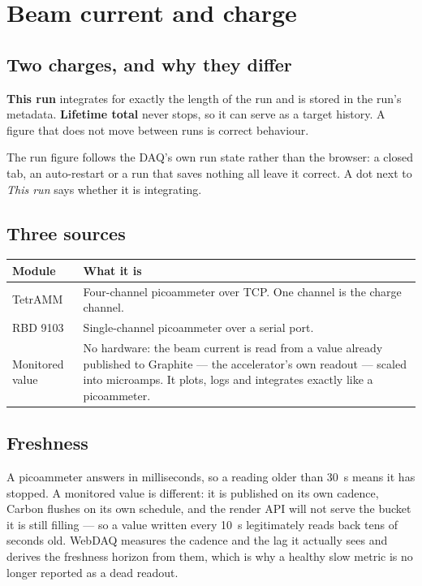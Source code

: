\documentclass[11pt,a4paper]{report}
\newcommand{\ui}[1]{\textbf{#1}}          %
\begin{document}
\chapter{Beam current and charge}

\section{Two charges, and why they differ}

\ui{This run} integrates for exactly the length of the run and is stored in the
run's metadata. \ui{Lifetime total} never stops, so it can serve as a target
history. A figure that does not move between runs is correct behaviour.

The run figure follows the DAQ's own run state rather than the browser: a closed
tab, an auto-restart or a run that saves nothing all leave it correct. A dot next
to \emph{This run} says whether it is integrating.

\section{Three sources}

\begin{center}
\begin{tabular}{@{}L{0.22\textwidth}L{0.70\textwidth}@{}}
\toprule
\textbf{Module} & \textbf{What it is} \\
\midrule
TetrAMM & Four-channel picoammeter over TCP. One channel is the charge channel. \\
RBD 9103 & Single-channel picoammeter over a serial port. \\
Monitored value & No hardware: the beam current is read from a value already
published to Graphite --- the accelerator's own readout --- scaled into
microamps. It plots, logs and integrates exactly like a picoammeter. \\
\bottomrule
\end{tabular}
\end{center}

\section{Freshness}

A picoammeter answers in milliseconds, so a reading older than 30~s means it has
stopped. A monitored value is different: it is published on its own cadence,
Carbon flushes on its own schedule, and the render API will not serve the bucket
it is still filling --- so a value written every 10~s legitimately reads back tens
of seconds old. WebDAQ measures the cadence and the lag it actually sees and
derives the freshness horizon from them, which is why a healthy slow metric is no
longer reported as a dead readout.
\end{document}
